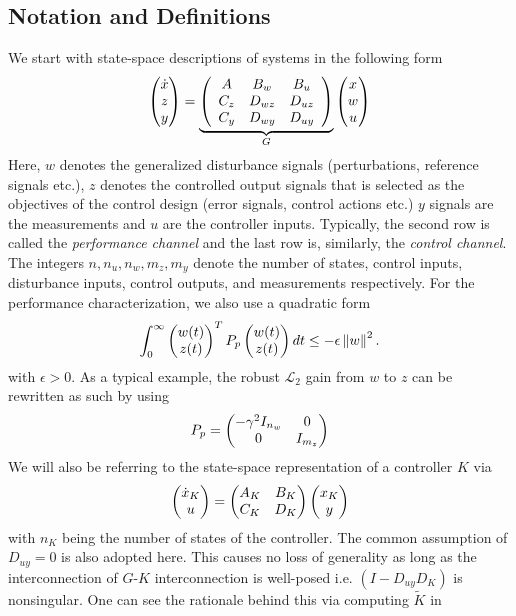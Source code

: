 \subsection{Notation and Definitions}
We start with state-space descriptions of systems in the following form 
\begin{equation}
\begin{pmatrix}\dot{x}\\ z\\ y\end{pmatrix} = 
\underbrace{\left(
\begin{array}{ccc}
	A    &B_w    &B_u\\
	C_z  &D_{wz} &D_{uz}\\
	C_y  &D_{wy} &D_{uy}
\end{array}
\right)}_{G}
\begin{pmatrix}x\\ w\\ u\end{pmatrix}
\label{eq:gennomplant}
\end{equation}
Here, $w$ denotes the generalized disturbance signals (perturbations, reference signals etc.), $z$ denotes the controlled
output signals that is selected as the objectives of the control design (error signals, control actions etc.)
$y$ signals are the measurements and $u$ are the controller inputs. Typically, the second row is called the \emph{performance 
channel} and the last row is, similarly, the \emph{control channel}. The integers $n,n_u,n_w,m_z,m_y$ denote the number of 
states, control inputs, disturbance inputs, control outputs, and measurements respectively. For the performance characterization, 
we also use a quadratic form 
\begin{equation}
\int_0^\infty{\begin{pmatrix}w(t) \\ z(t)\end{pmatrix}^TP_p \begin{pmatrix}w(t) \\ z(t)\end{pmatrix} dt} \leq -\epsilon\displaystyle \left\| w \right\|^2.
\label{eq:quadperf}
\end{equation}
with $\epsilon>0$. As a typical example, the robust $\mathcal{L}_2$ gain from $w$ to $z$ can be rewritten as such by using 
\[
P_p = \begin{pmatrix}-\gamma^2I_{n_w} &0\\ 0&I_{m_z}\end{pmatrix}
\]
We will also be referring to the state-space representation of a controller $K$ via
\begin{equation}
\begin{pmatrix}\dot{x}_K\\ u\end{pmatrix} = 
\begin{pmatrix}
	A_K  &B_K\\
	C_K  &D_K
\end{pmatrix}
\begin{pmatrix}x_K\\ y\end{pmatrix}
\label{eq:contmats}
\end{equation}
with $n_K$ being the number of states of the controller. The common assumption of $D_{uy}=0$ is also adopted here. This causes no 
loss of generality as long as the interconnection of $G$-$K$ interconnection is well-posed i.e. $(I-D_{uy}D_K)$ is nonsingular. One 
can see the rationale behind this via computing $\tilde{K}$ in 

